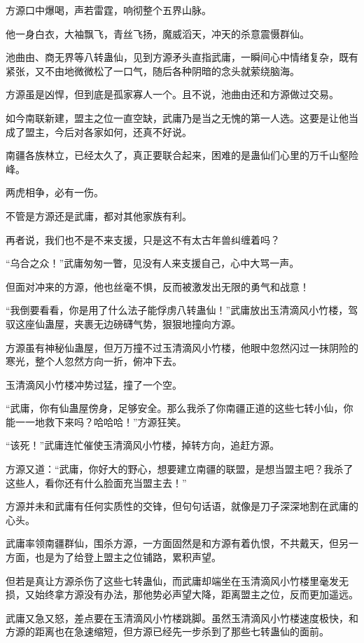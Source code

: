 \begin{this_body}
方源口中爆喝，声若雷霆，响彻整个五界山脉。

他一身白衣，大袖飘飞，青丝飞扬，魔威滔天，冲天的杀意震慑群仙。

池曲由、商无界等八转蛊仙，见到方源矛头直指武庸，一瞬间心中情绪复杂，既有紧张，又不由地微微松了一口气，随后各种阴暗的念头就萦绕脑海。

方源虽是凶悍，但到底是孤家寡人一个。且不说，池曲由还和方源做过交易。

如今南联新建，盟主之位一直空缺，武庸乃是当之无愧的第一人选。这要是让他当成了盟主，今后对各家如何，还真不好说。

南疆各族林立，已经太久了，真正要联合起来，困难的是蛊仙们心里的万千山壑险峰。

两虎相争，必有一伤。

不管是方源还是武庸，都对其他家族有利。

再者说，我们也不是不来支援，只是这不有太古年兽纠缠着吗？

“乌合之众！”武庸匆匆一瞥，见没有人来支援自己，心中大骂一声。

但面对冲来的方源，他也丝毫不惧，反而被激发出无限的勇气和战意！

“我倒要看看，你是用了什么法子能俘虏八转蛊仙！”武庸放出玉清滴风小竹楼，驾驭这座仙蛊屋，夹裹无边磅礴气势，狠狠地撞向方源。

方源虽有神秘仙蛊屋，但万万撞不过玉清滴风小竹楼，他眼中忽然闪过一抹阴险的寒光，整个人忽然方向一折，俯冲下去。

玉清滴风小竹楼冲势过猛，撞了一个空。

“武庸，你有仙蛊屋傍身，足够安全。那么我杀了你南疆正道的这些七转小仙，你能一一地救下来吗？哈哈哈！”方源狂笑。

“该死！”武庸连忙催使玉清滴风小竹楼，掉转方向，追赶方源。

方源又道：“武庸，你好大的野心，想要建立南疆的联盟，是想当盟主吧？我杀了这些人，看你还有什么脸面充当盟主去！”

方源并未和武庸有任何实质性的交锋，但句句话语，就像是刀子深深地割在武庸的心头。

武庸率领南疆群仙，围杀方源，一方面固然是和方源有着仇恨，不共戴天，但另一方面，也是为了给登上盟主之位铺路，累积声望。

但若是真让方源杀伤了这些七转蛊仙，而武庸却端坐在玉清滴风小竹楼里毫发无损，又始终拿方源没有办法，那他势必声望大降，距离盟主之位，反而更加遥远。

武庸又急又怒，差点要在玉清滴风小竹楼跳脚。虽然玉清滴风小竹楼速度极快，和方源的距离也在急速缩短，但方源已经先一步杀到了那些七转蛊仙的面前。


\end{this_body}
